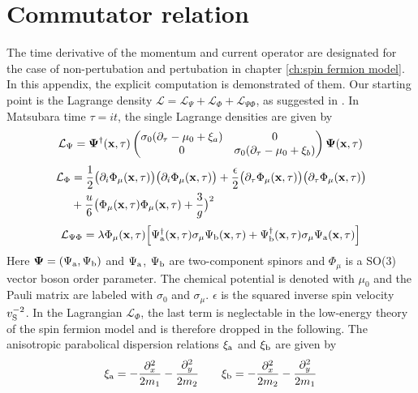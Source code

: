 %
%
%
\chapter{Commutator relation}
\label{appch:commutator}
%
%
%
The time derivative of the momentum and current operator are designated for the case of non-pertubation and pertubation in chapter \ref{ch:spin fermion model}.
In this appendix, the explicit computation is demonstrated of them.
Our starting point is the Lagrange density $\mathcal{L} = \mathcal{L}_{\Psi} + \mathcal{L}_{\Phi} + \mathcal{L}_{\Psi\Phi}$, as suggested in \cite{Patel&Sachdev}.
In Matsubara time $\tau = it$, the single Lagrange densities are given by
%
\begin{align}
	\mathcal{L}_{\Psi} = 
		\vb{\Psi}^{\dag}(\vb{x},\tau)
		\begin{pmatrix}\sigma_{0} (\partial_{\tau}-\mu_{0}+\xi_{a}) & 0\\0 & \sigma_{0} (\partial_{\tau}-\mu_{0}+\xi_{b})\end{pmatrix}
		\vb{\Psi}(\vb{x},\tau)
\end{align}
%
\begin{align}
	\mathcal{L}_{\Phi} &= 
		\frac{1}{2} \big(\partial_{i}\Phi_{\mu}(\vb{x},\tau)\big) \big(\partial_{i}\Phi_{\mu}(\vb{x},\tau)\big) 
		+ 
		\frac{\epsilon}{2} \big(\partial_{\tau}\Phi_{\mu}(\vb{x},\tau)\big) \big(\partial_{\tau}\Phi_{\mu}(\vb{x},\tau)\big) 
		\notag \\&+
		\frac{u}{6} \big(\Phi_{\mu}(\vb{x},\tau) \Phi_{\mu}(\vb{x},\tau) + \frac{3}{g}\big)^{2}
\end{align}
\begin{align}
	\mathcal{L}_{\Psi\Phi} =
		\lambda\Phi_{\mu}(\vb{x},\tau) \Big[\Psi_{\mathrm{a}}^{\dag}(\vb{x},\tau) \sigma_{\mu} \Psi_{\mathrm{b}}(\vb{x},\tau) + \Psi_{\mathrm{b}}^{\dag}(\vb{x},\tau) \sigma_{\mu} \Psi_{\mathrm{a}}(\vb{x},\tau)\Big]
\end{align}
Here $\vb{\Psi} = (\Psi_{\mathrm{a}}, \Psi_{\mathrm{b}})$ and $\Psi_{\mathrm{a}}$, $\Psi_{\mathrm{b}}$ are two-component spinors and $\Phi_{\mu}$ is a SO(3) vector boson order parameter.
The chemical potential is denoted with $\mu_0$ and the Pauli matrix are labeled with $\sigma_{0}$ and $\sigma_{\mu}$.
$\epsilon$ is the squared inverse spin velocity $v_{\mathrm{S}}^{-2}$.
In the Lagrangian $\mathcal{L}_{\Phi}$, the last term is neglectable in the low-energy theory of the spin fermion model and is therefore dropped in the following.
The anisotropic parabolical dispersion relations $\xi_{\mathrm{a}}$ and $\xi_{\mathrm{b}}$ are given by 
%
\begin{align}
	\xi_{\mathrm{a}} = - \frac{\partial_{x}^{2}}{2m_{1}} - \frac{\partial_{y}^{2}}{2m_{2}} \qquad \xi_{\mathrm{b}} = - \frac{\partial_{x}^{2}}{2m_{2}} - \frac{\partial_{y}^{2}}{2m_{1}}
\end{align}
